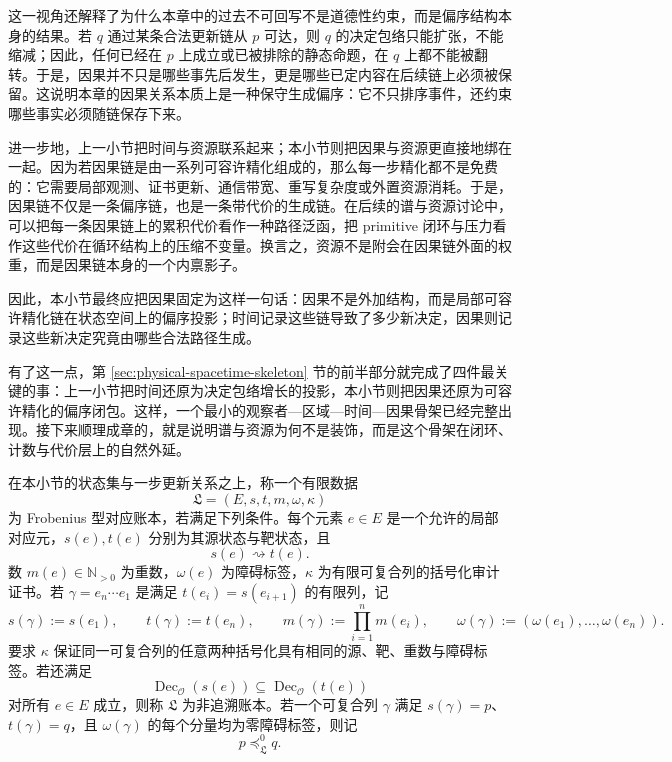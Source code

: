 这一视角还解释了为什么本章中的过去不可回写不是道德性约束，而是偏序结构本身的结果。若 \(q\) 通过某条合法更新链从 \(p\) 可达，则 \(q\) 的决定包络只能扩张，不能缩减；因此，任何已经在 \(p\) 上成立或已被排除的静态命题，在 \(q\) 上都不能被翻转。于是，因果并不只是哪些事先后发生，更是哪些已定内容在后续链上必须被保留。这说明本章的因果关系本质上是一种保守生成偏序：它不只排序事件，还约束哪些事实必须随链保存下来。

进一步地，上一小节把时间与资源联系起来；本小节则把因果与资源更直接地绑在一起。因为若因果链是由一系列可容许精化组成的，那么每一步精化都不是免费的：它需要局部观测、证书更新、通信带宽、重写复杂度或外置资源消耗。于是，因果链不仅是一条偏序链，也是一条带代价的生成链。在后续的谱与资源讨论中，可以把每一条因果链上的累积代价看作一种路径泛函，把 primitive 闭环与压力看作这些代价在循环结构上的压缩不变量。换言之，资源不是附会在因果链外面的权重，而是因果链本身的一个内禀影子。

因此，本小节最终应把因果固定为这样一句话：因果不是外加结构，而是局部可容许精化链在状态空间上的偏序投影；时间记录这些链导致了多少新决定，因果则记录这些新决定究竟由哪些合法路径生成。

有了这一点，第 \ref{sec:physical-spacetime-skeleton} 节的前半部分就完成了四件最关键的事：上一小节把时间还原为决定包络增长的投影，本小节则把因果还原为可容许精化的偏序闭包。这样，一个最小的观察者—区域—时间—因果骨架已经完整出现。接下来顺理成章的，就是说明谱与资源为何不是装饰，而是这个骨架在闭环、计数与代价层上的自然外延。
\begin{definition}\label{distill:connes_consani_arithmetic_site-frobenius_correspondence_spacetime_skeleton-correspondence-ledger}
在本小节的状态集与一步更新关系之上，称一个有限数据
\[
\mathfrak L=(E,s,t,m,\omega,\kappa)
\]
为 Frobenius 型对应账本，若满足下列条件。每个元素 \(e\in E\) 是一个允许的局部对应元，\(s(e),t(e)\) 分别为其源状态与靶状态，且
\[
s(e)\rightsquigarrow t(e).
\]
数 \(m(e)\in \mathbb N_{>0}\) 为重数，\(\omega(e)\) 为障碍标签，\(\kappa\) 为有限可复合列的括号化审计证书。若 \(\gamma=e_n\cdots e_1\) 是满足 \(t(e_i)=s(e_{i+1})\) 的有限列，记
\[
s(\gamma):=s(e_1),\qquad t(\gamma):=t(e_n),\qquad
m(\gamma):=\prod_{i=1}^n m(e_i),\qquad
\omega(\gamma):=(\omega(e_1),\ldots,\omega(e_n)).
\]
要求 \(\kappa\) 保证同一可复合列的任意两种括号化具有相同的源、靶、重数与障碍标签。若还满足
\[
\operatorname{Dec}_{\mathcal O}(s(e))\subseteq
\operatorname{Dec}_{\mathcal O}(t(e))
\]
对所有 \(e\in E\) 成立，则称 \(\mathfrak L\) 为非追溯账本。若一个可复合列 \(\gamma\) 满足 \(s(\gamma)=p\)、\(t(\gamma)=q\)，且 \(\omega(\gamma)\) 的每个分量均为零障碍标签，则记
\[
p\preceq_{\mathfrak L}^{0}q.
\]
\end{definition}


